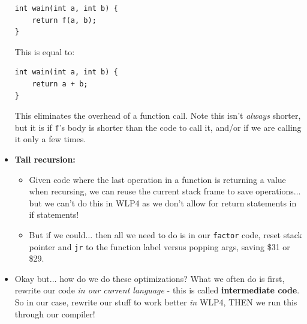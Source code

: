 \documentclass[12pt]{article}
\begin{document}
\begin{itemize}
\begin{lstlisting}[mathescape, numbers=none, breaklines=true]
int wain(int a, int b) {
    return f(a, b);
}
\end{lstlisting}
        This is equal to:
\begin{lstlisting}[mathescape, numbers=none, breaklines=true]
int wain(int a, int b) {
    return a + b;
}
\end{lstlisting}
        This eliminates the overhead of a function call.  Note this isn't \emph{always} shorter, but it is if \lstinline[mathescape]{f}'s body is shorter than the code to call it, and/or if we are calling it only a few times.
        \item \textbf{Tail recursion:} 
            \begin{itemize}
                \item Given code where the last operation in a function is returning a value when recursing, we can reuse the current stack frame to save operations$\dots$ but we can't do this in WLP4 as we don't allow for return statements in if statements!
                \item But if we could$\dots$ then all we need to do is in our \lstinline[mathescape]{factor} code, reset stack pointer and \lstinline[mathescape]{jr} to the function label versus popping args, saving \$31 or \$29.
            \end{itemize}
        \item Okay but$\dots$ how do we do these optimizations?  What we often do is first, rewrite our code \emph{in our current language} - this is called \textbf{intermediate code}.  So in our case, rewrite our stuff to work better \emph{in} WLP4, THEN we run this through our compiler!
\end{itemize}
\end{document}
